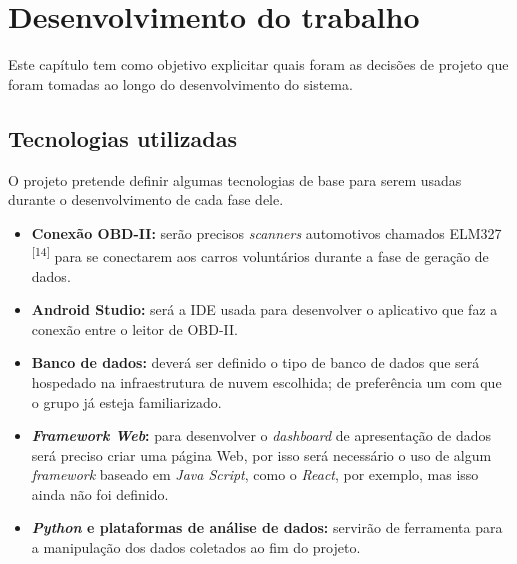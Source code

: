 \chapter{Desenvolvimento do trabalho}


Este capítulo tem como objetivo explicitar quais foram as decisões de projeto que foram tomadas ao longo do desenvolvimento do sistema.

\section{Tecnologias utilizadas}
O projeto pretende definir algumas tecnologias de base para serem usadas durante o desenvolvimento de cada fase dele.

\begin{itemize}
    \item \textbf{Conexão OBD-II:} serão precisos \textit{scanners} automotivos chamados ELM327 \textsuperscript{[14]} para se conectarem aos carros voluntários durante a fase de geração de dados.
    
    \item \textbf{Android Studio:} será a IDE usada para desenvolver o aplicativo que faz a conexão entre o leitor de OBD-II.
    
    \item \textbf{Banco de dados:} deverá ser definido o tipo de banco de dados que será hospedado na infraestrutura de nuvem escolhida; de preferência um com que o grupo já esteja familiarizado.
    
    \item \textbf{\textit{Framework Web}:} para desenvolver o \textit{dashboard} de apresentação de dados será preciso criar uma página Web, por isso será necessário o uso de algum \textit{framework} baseado em \textit{Java Script}, como o \textit{React}, por exemplo, mas isso ainda não foi definido.
    
    \item \textbf{\textit{Python} e plataformas de análise de dados:} servirão de ferramenta para a manipulação dos dados coletados ao fim do projeto.
\end{itemize}

